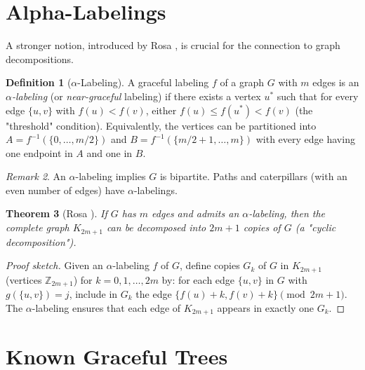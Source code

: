 \documentclass[12pt,a4paper]{amsart}
\newtheorem{theorem}{Theorem}[section]
\theoremstyle{definition}
\newtheorem{definition}[theorem]{Definition}
\theoremstyle{remark}
\newtheorem{remark}[theorem]{Remark}
\newcommand{\Z}{\mathbb{Z}}
\begin{document}
\section{Alpha-Labelings}\label{sec:alpha}

A stronger notion, introduced by Rosa \cite{Rosa1967}, is crucial for the
connection to graph decompositions.

\begin{definition}[$\alpha$-Labeling]\label{def:alpha}
A graceful labeling $f$ of a graph $G$ with $m$ edges is an \emph{$\alpha$-labeling}
(or \emph{near-graceful} labeling) if there exists a vertex $u^*$ such that
for every edge $\{u, v\}$ with $f(u) < f(v)$, either $f(u) \leq f(u^*) < f(v)$
(the "threshold" condition). Equivalently, the vertices can be partitioned into
$A = f^{-1}(\{0, \ldots, m/2\})$ and $B = f^{-1}(\{m/2 + 1, \ldots, m\})$ with
every edge having one endpoint in $A$ and one in $B$.
\end{definition}

\begin{remark}
An $\alpha$-labeling implies $G$ is bipartite. Paths and caterpillars (with an
even number of edges) have $\alpha$-labelings.
\end{remark}

\begin{theorem}[Rosa \cite{Rosa1967}]\label{thm:rosa_decomp}
If $G$ has $m$ edges and admits an $\alpha$-labeling, then the complete graph
$K_{2m+1}$ can be decomposed into $2m+1$ copies of $G$ (a "cyclic decomposition").
\end{theorem}

\begin{proof}[Proof sketch]
Given an $\alpha$-labeling $f$ of $G$, define copies $G_k$ of $G$ in $K_{2m+1}$
(vertices $\Z_{2m+1}$) for $k = 0, 1, \ldots, 2m$ by: for each edge
$\{u, v\}$ in $G$ with $g(\{u,v\}) = j$, include in $G_k$ the edge
$\{f(u) + k, f(v) + k\} \pmod{2m+1}$. The $\alpha$-labeling ensures that
each edge of $K_{2m+1}$ appears in exactly one $G_k$.
\end{proof}

\section{Known Graceful Trees}\label{sec:known}
\end{document}
